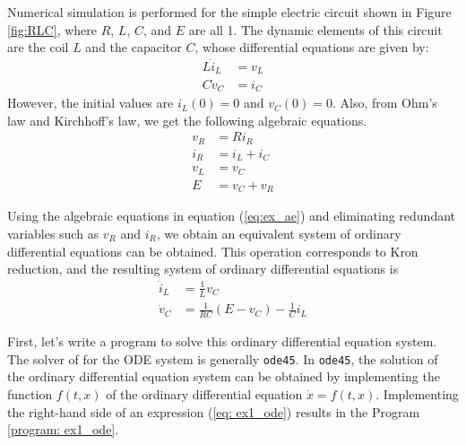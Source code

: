 \documentclass[graybox, envcountchap]{svmult}
\begin{document}
\begin{example}\label{ex:dae_ex1}
Numerical simulation is performed for the simple electric circuit shown in Figure \ref{fig:RLC}, where $R$, $L$, $C$, and $E$ are all 1.
The dynamic elements of this circuit are the coil $L$ and the capacitor $C$, whose differential equations are given by:
\begin{subequations}\label{eq:ex_de}
  \begin{align}
    L\dot i_L & = v_L \\
    C\dot v_C & = i_C
  \end{align}
\end{subequations}
However, the initial values are $i_L(0)=0$ and $v_C(0)=0$.
Also, from Ohm's law and Kirchhoff's law, we get the following algebraic equations.
\begin{subequations}\label{eq:ex_ae}
  \begin{align}
    v_R & =R i_R      \\
    i_R & = i_L + i_C \\
    v_L & = v_C       \\
    E   & = v_C + v_R
  \end{align}
\end{subequations}

Using the algebraic equations in equation (\ref{eq:ex_ae}) and eliminating redundant variables such as $v_R$ and $i_R$, we obtain an equivalent system of ordinary differential equations can be obtained.
This operation corresponds to Kron reduction, and the resulting system of ordinary differential equations is
\begin{subequations}\label{eq:ex1_ode}
  \begin{align}
    \dot{i}_L & = \frac{1}{L}v_C                     \\
    \dot{v}_C & = \frac{1}{RC}(E-v_C)-\frac{1}{C}i_L
  \end{align}
\end{subequations}

First, let's write a program to solve this ordinary differential equation system.
The solver of \matlab for the ODE system is generally \verb|ode45|.
In \verb|ode45|, the solution of the ordinary differential equation system can be obtained by implementing the function $f(t,x)$ of the ordinary differential equation $\dot{x} = f(t,x) $.
Implementing the right-hand side of an expression (\ref{eq: ex1_ode}) results in the Program \ref{program: ex1_ode}.


\end{example}
\end{document}
